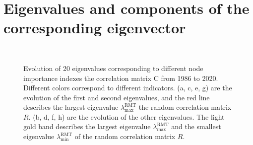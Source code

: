 \documentclass[preprint,3p,times,sort&compress]{elsarticle}
\begin{document}
\clearpage



\renewcommand\thefigure{\Alph{section}\arabic{figure}}    
\section{Eigenvalues and components of the corresponding eigenvector}
\label{sec5-2}
\setcounter{figure}{0}    

 \begin{figure}[h]
      \centering
     \subfigbottomskip=-1pt
     \subfigcapskip=-5pt
      \\
      \caption{Evolution of 20 eigenvalues corresponding to different node importance indexes the correlation matrix $\mathrm{C}$ from 1986 to 2020. Different colors correspond to different indicators. (a, c, e, g) are the evolution of the first and second eigenvalues, and the red line describes the largest eigenvalue $\lambda_{\max }^{\mathrm{RMT}}$ the random correlation matrix $R$. (b, d, f, h) are the evolution of the other eigenvalues. The light gold band describes the largest eigenvalue $\lambda_{\max }^{\mathrm{RMT}}$ and the smallest eigenvalue $\lambda_{\min }^{\mathrm{RMT}}$ of the random correlation matrix $R$.}
      \label{Fig:iCTN:eigenvalue:t}
\end{figure}
\end{document}
